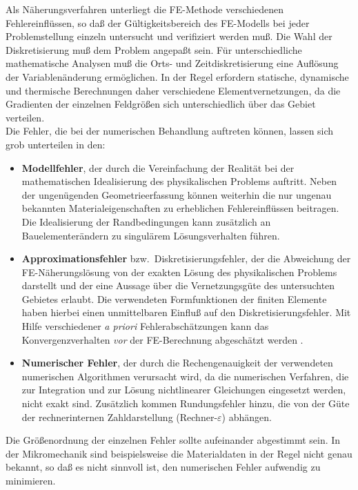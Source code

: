 Als Näherungsverfahren unterliegt die FE-Methode verschiedenen
Fehlereinflüssen, so daß der Gültigkeitsbereich des FE-Modells
bei jeder Problemstellung einzeln untersucht und verifiziert werden muß.
Die Wahl der Diskretisierung muß dem Problem angepaßt sein. Für
unterschiedliche mathematische Analysen muß die Orts- und
Zeitdiskretisierung eine Auflösung der Variablenänderung ermöglichen.
In der Regel erfordern statische, dynamische und thermische Berechnungen
daher verschiedene Elementvernetzungen, da die Gradienten der
einzelnen Feldgrößen sich unterschiedlich über das Gebiet
verteilen.\\
%
Die Fehler, die bei der numerischen Behandlung auftreten können,
lassen sich grob unterteilen in den: %
%
\begin{itemize}
\item
{\bf Modellfehler}, der durch die Vereinfachung der Realität bei
der mathematischen Idealisierung des physikalischen Problems auftritt.
Neben der ungenügenden Geometrieerfassung können weiterhin die nur ungenau
bekannten Materialeigenschaften zu erheblichen Fehlereinflüssen beitragen.
Die Idealisierung der Randbedingungen kann zusätzlich an
Bauelemen\-terändern zu singulärem Lösungsverhalten führen.
\item
{\bf Approximationsfehler} bzw.\ Diskretisierungsfehler, der die
Abweichung der FE-Näherungslösung von der exakten Lösung des
physikalischen Problems darstellt und der eine Aussage über die
Vernetzungsgüte des untersuchten Gebietes erlaubt. Die verwendeten
Formfunktionen der finiten Elemente haben hierbei einen unmittelbaren
Einfluß auf den Diskretisierungsfehler. Mit Hilfe verschiedener
{\em a priori} Fehlerabschätzungen kann das Konvergenzverhalten {\em vor}
der FE-Berechnung abgeschätzt werden \cite{Goe93}.
\item
{\bf Numerischer Fehler}, der durch die
Rechengenauigkeit der verwendeten numerischen Algorithmen verursacht
wird, da die numerischen Verfahren, die zur Integration und zur Lösung
nichtlinearer Gleichungen eingesetzt werden, nicht exakt sind. Zusätzlich
kommen Rundungsfehler hinzu, die von der Güte der rechnerinternen
Zahldarstellung (Rechner-$\varepsilon$) abhängen.
\end{itemize}
%
Die Größenordnung der einzelnen Fehler sollte aufeinander abgestimmt sein.
In der Mikromechanik sind beispielsweise die Materialdaten in der Regel
nicht genau
bekannt, so daß es nicht sinnvoll ist, den numerischen Fehler aufwendig
zu minimieren.\\
